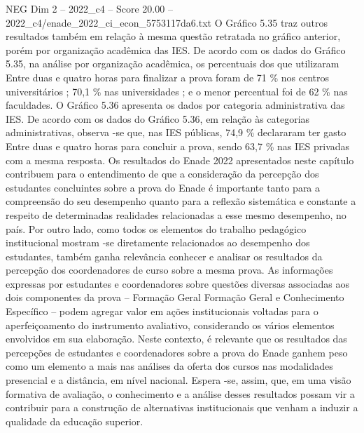\begin{textsample}{NEG Dim 2 – 2022\_c4 – Score 20.00 – 2022\_c4/enade\_2022\_ci\_econ\_5753117da6.txt}
O Gráfico 5.35 traz outros resultados também em relação à mesma questão retratada no gráfico anterior, porém por organização acadêmica das IES.
De acordo com os dados do Gráfico 5.35, na análise por organização acadêmica, os percentuais dos que utilizaram Entre duas e quatro horas para finalizar a prova foram de 71 \% nos centros universitários ; 70,1 \% nas universidades ; e o menor percentual foi de 62 \% nas faculdades.
O Gráfico 5.36 apresenta os dados por categoria administrativa das IES.
De acordo com os dados do Gráfico 5.36, em relação às categorias administrativas, observa -se que, nas IES públicas, 74,9 \% declararam ter gasto Entre duas e quatro horas para concluir a prova, sendo 63,7 \% nas IES privadas com a mesma resposta.
Os resultados do Enade 2022 apresentados neste capítulo contribuem para o entendimento de que a consideração da percepção dos estudantes concluintes sobre a prova do Enade é importante tanto para a compreensão do seu desempenho quanto para a reflexão sistemática e constante a respeito de determinadas realidades relacionadas a esse mesmo desempenho, no país.
Por outro lado, como todos os elementos do trabalho pedagógico institucional mostram -se diretamente relacionados ao desempenho dos estudantes, também ganha relevância conhecer e analisar os resultados da percepção dos coordenadores de curso sobre a mesma prova.
As informações expressas por estudantes e coordenadores sobre questões diversas associadas aos dois componentes da prova – Formação Geral Formação Geral e Conhecimento Específico – podem agregar valor em ações institucionais voltadas para o aperfeiçoamento do instrumento avaliativo, considerando os vários elementos envolvidos em sua elaboração.
Neste contexto, é relevante que os resultados das percepções de estudantes e coordenadores sobre a prova do Enade ganhem peso como um elemento a mais nas análises da oferta dos cursos nas modalidades presencial e a distância, em nível nacional.
Espera -se, assim, que, em uma visão formativa de avaliação, o conhecimento e a análise desses resultados possam vir a contribuir para a construção de alternativas institucionais que venham a induzir a qualidade da educação superior.

\end{textsample}
